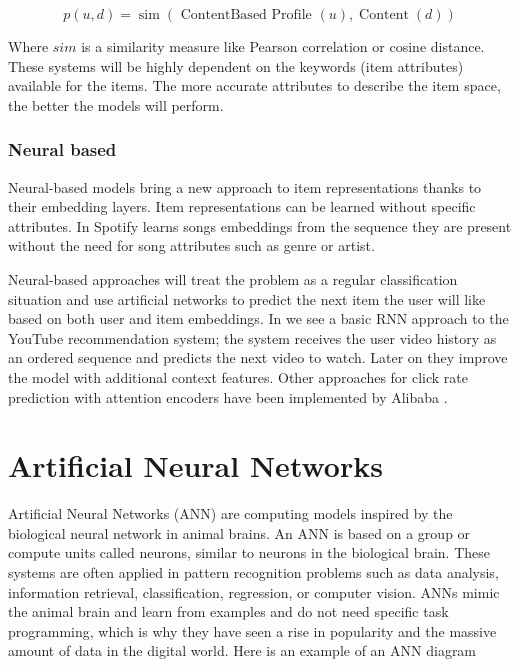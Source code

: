 \documentclass{kththesis}
\begin{document}
\begin{equation}
p(u, d)=\operatorname{sim}(\text { ContentBased Profile }(u), \operatorname{Content}(d))
\end{equation}

Where $sim$ is a similarity measure like Pearson correlation or cosine distance.
These systems will be highly dependent on the keywords (item attributes) available for the items. The more accurate attributes to describe the item space, the better the models will perform.

\subsubsection{Neural based}
Neural-based models bring a new approach to item representations \cite{content-embeddings} thanks to their embedding layers. Item representations can be learned without specific attributes. In \cite{spotifyembeddings} Spotify learns songs embeddings from the sequence they are present without the need for song attributes such as genre or artist.

Neural-based approaches will treat the problem as a regular classification situation and use artificial networks to predict the next item the user will like based on both user and item embeddings. In \cite{rnn-youtube} we see a basic RNN approach to the YouTube recommendation system; the system receives the user video history as an ordered sequence and predicts the next video to watch. Later on \cite{rnn-youtube-improved} they improve the model with additional context features. Other approaches for click rate prediction with attention encoders have been implemented by Alibaba \cite{alibaba}.





\section{Artificial Neural Networks}
Artificial Neural Networks (ANN) are computing models inspired by the biological neural network in animal brains. An ANN is based on a group or compute units called neurons, similar to neurons in the biological brain. These systems are often applied in pattern recognition \cite{pattern-bishop} problems such as data analysis, information retrieval, classification, regression, or computer vision. ANNs mimic the animal brain and learn from examples and do not need specific task programming, which is why they have seen a rise in popularity and the massive amount of data in the digital world. Here is an example of an ANN diagram
\end{document}
